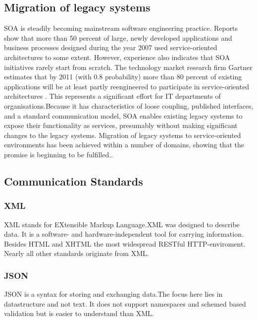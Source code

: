 \documentclass[12pt]{article}
\begin{document}
\subsection{Migration of legacy systems}
SOA is steadily becoming mainstream software engineering practice. Reports show that more than 50 percent of large, newly developed applications and business processes designed during the year 2007 used service-oriented architectures to some extent. However, experience also indicates that SOA initiatives rarely start from scratch. The technology market research firm Gartner estimates that by 2011 (with 0.8 probability) more than 80 percent of existing applications will be at least partly reengineered to participate in service-oriented architectures . This represents a significant effort for IT departments of organisations.Because it has characteristics of loose coupling, published interfaces, and a standard communication model, SOA enables existing legacy systems to expose their functionality as services, presumably without making significant changes to the legacy systems. Migration of legacy systems to service-oriented environments has been achieved within a number of domains, showing that the promise is beginning to be fulfilled.\cite{legacy}.
\\
\subsection{Communication Standards}

\subsubsection{XML}
XML stands for EXtensible Markup Language.XML was designed to describe data.
It is a software- and hardware-independent tool for carrying information.\\
Besides HTML and XHTML the most widespread RESTful HTTP-enviroment.\\
Nearly all other standards originate from XML.
\subsubsection{JSON}
JSON is a syntax for storing and exchanging data.The focus here lies in datastructure and not text.
It does not support namespaces and schemed based validation but is easier to understand than XML.
\end{document}
